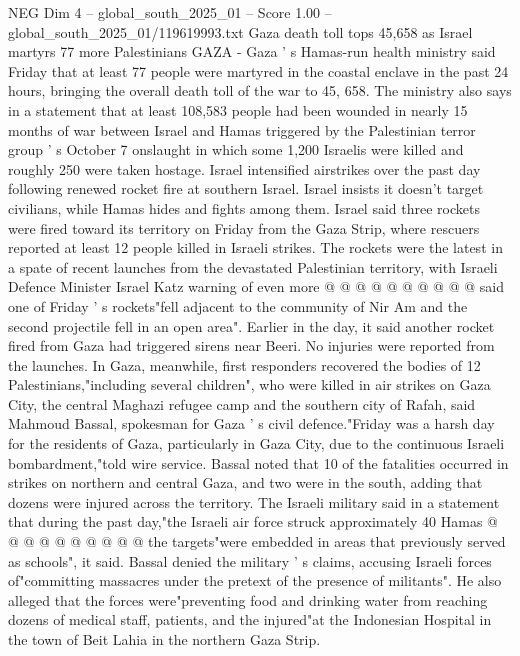 \begin{textsample}{NEG Dim 4 – global\_south\_2025\_01 – Score 1.00 – global\_south\_2025\_01/119619993.txt}  \label{ex:f4_neg_445}
Gaza death toll tops 45,658 as Israel martyrs 77 more Palestinians GAZA - Gaza ' s Hamas-run health ministry said Friday that at least 77 people were martyred in the coastal enclave in the past 24 hours, bringing the overall death toll of the war to 45, 658.
The ministry also says in a statement that at least 108,583 people had been wounded in nearly 15 months of war between Israel and Hamas triggered by the Palestinian terror group ' s October 7 onslaught in which some 1,200 Israelis were killed and roughly 250 were taken hostage.
Israel intensified airstrikes over the past day following renewed rocket fire at southern Israel.
Israel insists it doesn't target civilians, while Hamas hides and fights among them.
Israel said three rockets were fired toward its territory on Friday from the Gaza Strip, where rescuers reported at least 12 people killed in Israeli strikes.
The rockets were the latest in a spate of recent launches from the devastated Palestinian territory, with Israeli Defence Minister Israel Katz warning of even more @ @ @ @ @ @ @ @ @ @ said one of Friday ' s rockets"fell adjacent to the community of Nir Am and the second projectile fell in an open area".
Earlier in the day, it said another rocket fired from Gaza had triggered sirens near Beeri.
No injuries were reported from the launches.
In Gaza, meanwhile, first responders recovered the bodies of 12 Palestinians,"including several children", who were killed in air strikes on Gaza City, the central Maghazi refugee camp and the southern city of Rafah, said Mahmoud Bassal, spokesman for Gaza ' s civil defence."Friday was a harsh day for the residents of Gaza, particularly in Gaza City, due to the continuous Israeli bombardment,"told wire service.
Bassal noted that 10 of the fatalities occurred in strikes on northern and central Gaza, and two were in the south, adding that dozens were injured across the territory.
The Israeli military said in a statement that during the past day,"the Israeli air force struck approximately 40 Hamas @ @ @ @ @ @ @ @ @ @ the targets"were embedded in areas that previously served as schools", it said.
Bassal denied the military ' s claims, accusing Israeli forces of"committing massacres under the pretext of the presence of militants".
He also alleged that the forces were"preventing food and drinking water from reaching dozens of medical staff, patients, and the injured"at the Indonesian Hospital in the town of Beit Lahia in the northern Gaza Strip.

\end{textsample}
